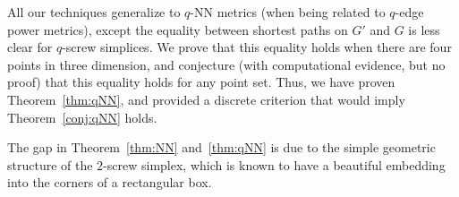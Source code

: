 All our techniques generalize to $q$-NN metrics (when being related to $q$-edge power
metrics), except the equality
between shortest paths on $G'$ and $G$ is less clear for $q$-screw
simplices. We prove that this equality holds when there are four points in
three dimension, and conjecture (with computational evidence, but no proof) that this
equality holds for any point set. Thus, we have proven
Theorem~\ref{thm:qNN}, and provided a discrete criterion that would imply
Theorem~\ref{conj:qNN} holds.

The gap in Theorem~\ref{thm:NN} and~\ref{thm:qNN} is due to the simple
geometric structure of the $2$-screw simplex, which is known to have a
beautiful embedding into the corners of a rectangular box.






